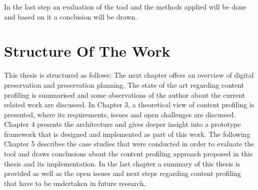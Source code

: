 In the last step an evaluation of the tool and the methods applied will be done and based on it a conclusion will be drawn.

\section{Structure Of The Work}
\label{sec:structure_of_the_work}
This thesis is structured as follows: The next chapter offers an overview of digital preservation and preservation planning.
The state of the art regarding content profiling is summarised and some observations of the author about the current related work are discussed.
In Chapter 3, a theoretical view of content profiling is presented, where its requirements, issues and open challenges are discussed.
Chapter 4 presents the architecture and gives deeper insight into a prototype framework that is designed and implemented as part of this work.
The following Chapter 5 describes the case studies that were conducted in order to evaluate the tool and draws conclusions about the content profiling approach proposed in this thesis and its implementation.
In the last chapter a summary of this thesis is provided as well as the open issues and next steps regarding content profiling that have to be undertaken in future research.